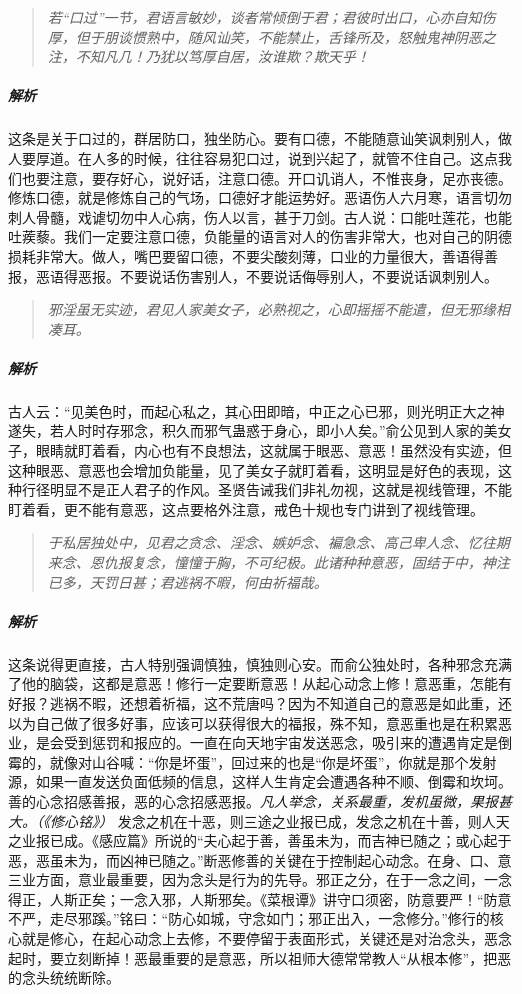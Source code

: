 \begin{quote}\it
    若“口过”一节，君语言敏妙，谈者常倾倒于君；君彼时出口，心亦自知伤厚，但于朋谈惯熟中，随风讪笑，不能禁止，舌锋所及，怒触鬼神阴恶之注，不知凡几！乃犹以笃厚自居，汝谁欺？欺天乎！
\end{quote}

\subparagraph{解析} 这条是关于口过的，群居防口，独坐防心。要有口德，不能随意讪笑讽刺别人，做人要厚道。在人多的时候，往往容易犯口过，说到兴起了，就管不住自己。这点我们也要注意，要存好心，说好话，注意口德。开口讥诮人，不惟丧身，足亦丧德。修炼口德，就是修炼自己的气场，口德好才能运势好。恶语伤人六月寒，语言切勿刺人骨髓，戏谑切勿中人心病，伤人以言，甚于刀剑。古人说：口能吐莲花，也能吐蒺藜。我们一定要注意口德，负能量的语言对人的伤害非常大，也对自己的阴德损耗非常大。做人，嘴巴要留口德，不要尖酸刻薄，口业的力量很大，善语得善报，恶语得恶报。不要说话伤害别人，不要说话侮辱别人，不要说话讽刺别人。

\begin{quote}\it
    邪淫虽无实迹，君见人家美女子，必熟视之，心即摇摇不能遣，但无邪缘相凑耳。
\end{quote}

\subparagraph{解析} 古人云：“见美色时，而起心私之，其心田即暗，中正之心已邪，则光明正大之神遂失，若人时时存邪念，积久而邪气蛊惑于身心，即小人矣。”俞公见到人家的美女子，眼睛就盯着看，内心也有不良想法，这就属于眼恶、意恶！虽然没有实迹，但这种眼恶、意恶也会增加负能量，见了美女子就盯着看，这明显是好色的表现，这种行径明显不是正人君子的作风。圣贤告诫我们非礼勿视，这就是视线管理，不能盯着看，更不能有意恶，这点要格外注意，戒色十规也专门讲到了视线管理。

\begin{quote}\it
    于私居独处中，见君之贪念、淫念、嫉妒念、褊急念、高己卑人念、忆往期来念、恩仇报复念，憧憧于胸，不可纪极。此诸种种意恶，固结于中，神注已多，天罚日甚；君逃祸不暇，何由祈福哉。
\end{quote}

\subparagraph{解析} 这条说得更直接，古人特别强调慎独，慎独则心安。而俞公独处时，各种邪念充满了他的脑袋，这都是意恶！修行一定要断意恶！从起心动念上修！意恶重，怎能有好报？逃祸不暇，还想着祈福，这不荒唐吗？因为不知道自己的意恶是如此重，还以为自己做了很多好事，应该可以获得很大的福报，殊不知，意恶重也是在积累恶业，是会受到惩罚和报应的。一直在向天地宇宙发送恶念，吸引来的遭遇肯定是倒霉的，就像对山谷喊：“你是坏蛋”，回过来的也是“你是坏蛋”，你就是那个发射源，如果一直发送负面低频的信息，这样人生肯定会遭遇各种不顺、倒霉和坎坷。善的心念招感善报，恶的心念招感恶报。\textit{凡人举念，关系最重，发机虽微，果报甚大。（《修心铭》）} 发念之机在十恶，则三途之业报已成，发念之机在十善，则人天之业报已成。《感应篇》所说的“夫心起于善，善虽未为，而吉神已随之；或心起于恶，恶虽未为，而凶神已随之。”断恶修善的关键在于控制起心动念。在身、口、意三业方面，意业最重要，因为念头是行为的先导。邪正之分，在于一念之间，一念得正，人斯正矣；一念入邪，人斯邪矣。《菜根谭》讲守口须密，防意要严！“防意不严，走尽邪蹊。”铭曰：“防心如城，守念如门；邪正出入，一念修分。”修行的核心就是修心，在起心动念上去修，不要停留于表面形式，关键还是对治念头，恶念起时，要立刻断掉！恶最重要的是意恶，所以祖师大德常常教人“从根本修”，把恶的念头统统断除。

